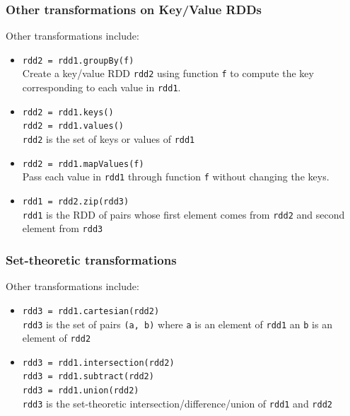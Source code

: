 \documentclass[english,serif,mathserif]{beamer}
\begin{document}
\begin{frame}[fragile]
  \frametitle{Other transformations on Key/Value RDDs}

  Other transformations include:
  \begin{itemize}
  \item \lstinline|rdd2 = rdd1.groupBy(f)| \\
    Create a key/value RDD \texttt{rdd2} using function \texttt{f} to
    compute the key corresponding to each value in \texttt{rdd1}.
  \item \lstinline|rdd2 = rdd1.keys()| \\
   \lstinline|rdd2 = rdd1.values()| \\
    \texttt{rdd2} is the set of keys or values of \texttt{rdd1}
  \item \lstinline|rdd2 = rdd1.mapValues(f)| \\
    Pass each value in \texttt{rdd1} through function \texttt{f}
    without changing the keys.
  \item \lstinline|rdd1 = rdd2.zip(rdd3)| \\
    \texttt{rdd1} is the RDD of pairs whose first element comes from
    \texttt{rdd2} and second element from \texttt{rdd3}
\end{itemize}
\end{frame}


\begin{frame}[fragile]
  \frametitle{Set-theoretic transformations}

  Other transformations include:
  \begin{itemize}
  \item \lstinline|rdd3 = rdd1.cartesian(rdd2)| \\
    \texttt{rdd3} is the set of pairs \texttt{(a, b)} where \texttt{a}
    is an element of \texttt{rdd1} an \texttt{b} is an element of
    \texttt{rdd2}
  \item \lstinline|rdd3 = rdd1.intersection(rdd2)| \\
   \lstinline|rdd3 = rdd1.subtract(rdd2)| \\
   \lstinline|rdd3 = rdd1.union(rdd2)| \\
    \texttt{rdd3} is the set-theoretic intersection/difference/union of \texttt{rdd1} and \texttt{rdd2}
\end{itemize}
\end{frame}
\end{document}
